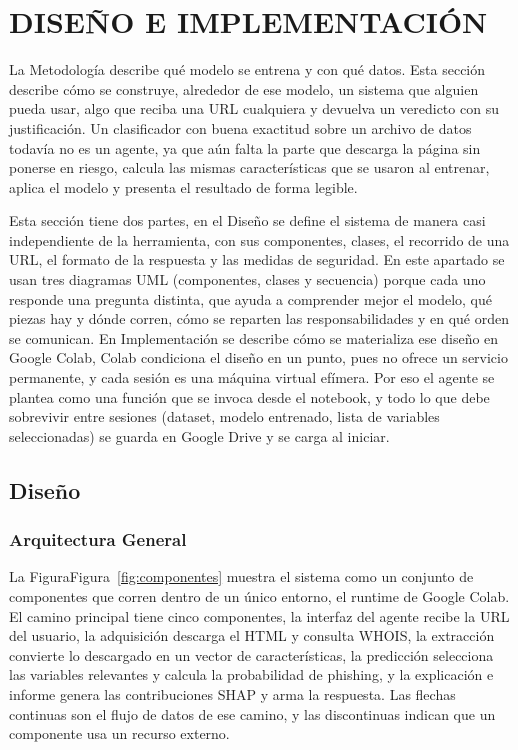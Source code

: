 \section{DISEÑO E IMPLEMENTACIÓN}

La Metodología describe qué modelo se entrena y con qué datos. Esta sección describe cómo se construye, alrededor de ese modelo, un sistema que alguien pueda usar, algo que reciba una URL cualquiera y devuelva un veredicto con su justificación. Un clasificador con buena exactitud sobre un archivo de datos todavía no es un agente, ya que aún falta la parte que descarga la página sin ponerse en riesgo, calcula las mismas características que se usaron al entrenar, aplica el modelo y presenta el resultado de forma legible. \newline

Esta sección tiene dos partes, en el Diseño se define el sistema de manera casi independiente de la herramienta, con sus componentes, clases, el recorrido de una URL, el formato de la respuesta y las medidas de seguridad. En este apartado se usan tres diagramas UML (componentes, clases y secuencia) porque cada uno responde una pregunta distinta, que ayuda a comprender mejor el modelo, qué piezas hay y dónde corren, cómo se reparten las responsabilidades y en qué orden se comunican. En Implementación se describe cómo se materializa ese diseño en Google Colab, Colab condiciona el diseño en un punto, pues no ofrece un servicio permanente, y cada sesión es una máquina virtual efímera. Por eso el agente se plantea como una función que se invoca desde el notebook, y todo lo que debe sobrevivir entre sesiones (dataset, modelo entrenado, lista de variables seleccionadas) se guarda en Google Drive y se carga al iniciar.

\subsection{Diseño}

\subsubsection{Arquitectura General} 

La FiguraFigura~\ref{fig:componentes} muestra el sistema como un conjunto de componentes que corren dentro de un único entorno, el runtime de Google Colab. El camino principal tiene cinco componentes, la interfaz del agente recibe la URL del usuario, la adquisición descarga el HTML y consulta WHOIS, la extracción convierte lo descargado en un vector de características, la predicción selecciona las variables relevantes y calcula la probabilidad de phishing, y la explicación e informe genera las contribuciones SHAP y arma la respuesta. Las flechas continuas son el flujo de datos de ese camino, y las discontinuas indican que un componente usa un recurso externo. \newline

